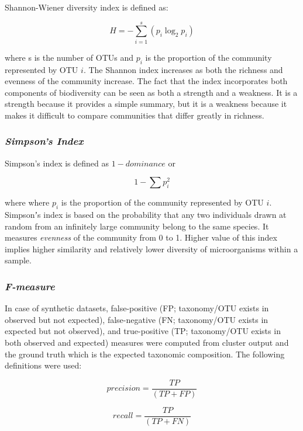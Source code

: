 \documentclass[10pt, conference, compsocconf]{IEEEtran}
\begin{document}
Shannon-Wiener diversity index is defined as:

\begin{equation}
H={-} \sum_{i=1}^{s} \left( p_i\log_2p_i \right)
\end{equation}

where s is the number of OTUs and $p_i$ is the proportion of the community represented by OTU $i$. The Shannon index increases as both the richness and evenness of the community increase. The fact that the index incorporates both components of biodiversity can be seen as both a strength and a weakness. It is a strength because it provides a simple summary, but it is a weakness because it makes it difficult to compare communities that differ greatly in richness.


\subsubsection{\textit{Simpson's Index}}
Simpson’s index is defined as ${1-dominance}$ or

\begin{equation}
1 - \sum p_i^2
\end{equation}

where where $p_i$ is the proportion of the community represented by OTU $i$. Simpsonʼs index is based on the probability that any two individuals drawn at random from an infinitely large community belong to the same species. It measures \textit{evenness} of the community from 0 to 1. Higher value of this index implies higher similarity and relatively lower diversity of microorganisms within a sample.


\subsubsection{\textit{F-measure}}
In case of synthetic datasets, false-positive (FP; taxonomy/OTU exists in observed but not expected), false-negative
(FN; taxonomy/OTU exists in expected but not observed), and 
true-positive (TP; taxonomy/OTU exists in both observed and expected) measures were computed from 
cluster output and the ground truth which is the expected taxonomic composition. The following definitions were used:

\begin{equation}
precision = \frac{TP}{(TP + FP)}
\end{equation}

\begin{equation}
recall = \frac{TP}{(TP + FN)}
\end{equation}
\end{document}
